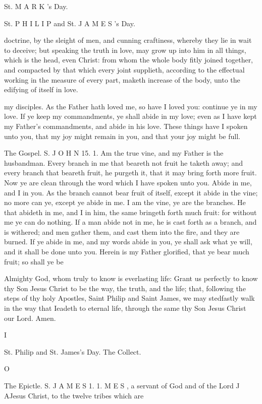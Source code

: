 St. M A R K ’s Day.

St. P H I L I P and St. J A M E S ’s Day.

doctrine, by the sleight of men, and cunning craftiness, whereby they lie in wait to deceive; but speaking the truth in love, may grow up into him in all things, which is the head, even Christ: from whom the whole body fitly joined together, and compacted by that which every joint supplieth, according to the effectual working in the measure of every part, maketh increase of the body, unto the edifying of itself in love.

my disciples. As the Father hath loved me, so have I loved you: continue ye in my love. If ye keep my commandments, ye shall abide in my love; even as I have kept my Father’s commandments, and abide in his love. These things have I spoken unto you, that my joy might remain in you, and that your joy might be full.

The Gospel. S. J O H N 15. 1. Am the true vine, and my Father is the husbandman. Every branch in me that beareth not fruit he taketh away; and every branch that beareth fruit, he purgeth it, that it may bring forth more fruit. Now ye are clean through the word which I have spoken unto you. Abide in me, and I in you. As the branch cannot bear fruit of itself, except it abide in the vine; no more can ye, except ye abide in me. I am the vine, ye are the branches. He that abideth in me, and I in him, the same bringeth forth much fruit: for without me ye can do nothing. If a man abide not in me, he is cast forth as a branch, and is withered; and men gather them, and cast them into the fire, and they are burned. If ye abide in me, and my words abide in you, ye shall ask what ye will, and it shall be done unto you. Herein is my Father glorified, that ye bear much fruit; so shall ye be

Almighty God, whom truly to know is everlasting life: Grant us perfectly to know thy Son Jesus Christ to be the way, the truth, and the life; that, following the steps of thy holy Apostles, Saint Philip and Saint James, we may stedfastly walk in the way that Ieadeth to eternal life, through the same thy Son Jesus Christ our Lord. Amen.

I

St. Philip and St. James’s Day. The Collect.

O

The Epictle. S. J A M E S 1. 1. M E S , a servant of God and of the Lord J AJesus Christ, to the twelve tribes which are


